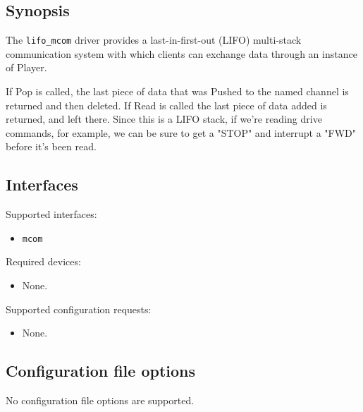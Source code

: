 
\subsection*{Synopsis}
 The {\tt lifo\_mcom} driver provides a last-in-first-out (LIFO)
 multi-stack communication system with which clients can exchange data
 through an instance of Player.

 If Pop is called, the last piece of data that was Pushed to the named
 channel is returned and then deleted.  If Read is called the last piece
 of data added is returned, and left there.  Since this is a LIFO stack,
 if we're reading drive commands, for example, we can be sure to get a
 "STOP" and interrupt a "FWD" before it's been read.

\subsection*{Interfaces}

\noindent Supported interfaces:
\begin{itemize}
\item {\tt mcom}
\end{itemize}

\noindent Required devices:
\begin{itemize}
\item None.
\end{itemize}

\noindent Supported configuration requests:
\begin{itemize}
\item None.
\end{itemize}

\subsection*{Configuration file options}
No configuration file options are supported.

